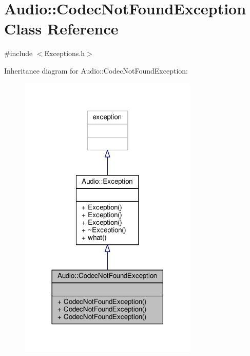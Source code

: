 \hypertarget{classAudio_1_1CodecNotFoundException}{}\section{Audio\+:\+:Codec\+Not\+Found\+Exception Class Reference}
\label{classAudio_1_1CodecNotFoundException}


{\ttfamily \#include $<$Exceptions.\+h$>$}



Inheritance diagram for Audio\+:\+:Codec\+Not\+Found\+Exception\+:
\nopagebreak
\begin{figure}[H]
\begin{center}
\leavevmode
\includegraphics[width=242pt]{d1/d31/classAudio_1_1CodecNotFoundException__inherit__graph}
\end{center}
\end{figure}


